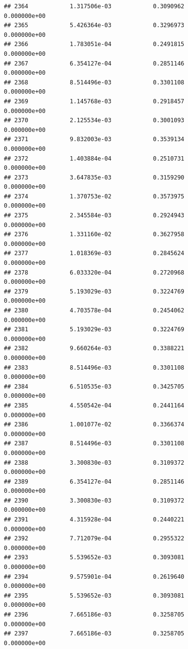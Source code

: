 \documentclass[
]{article}
\begin{document}
\begin{verbatim}
## 2364            1.317506e-03            0.3090962            0.000000e+00
## 2365            5.426364e-03            0.3296973            0.000000e+00
## 2366            1.783051e-04            0.2491815            0.000000e+00
## 2367            6.354127e-04            0.2851146            0.000000e+00
## 2368            8.514496e-03            0.3301108            0.000000e+00
## 2369            1.145768e-03            0.2918457            0.000000e+00
## 2370            2.125534e-03            0.3001093            0.000000e+00
## 2371            9.832003e-03            0.3539134            0.000000e+00
## 2372            1.403884e-04            0.2510731            0.000000e+00
## 2373            3.647835e-03            0.3159290            0.000000e+00
## 2374            1.370753e-02            0.3573975            0.000000e+00
## 2375            2.345584e-03            0.2924943            0.000000e+00
## 2376            1.331160e-02            0.3627958            0.000000e+00
## 2377            1.018369e-03            0.2845624            0.000000e+00
## 2378            6.033320e-04            0.2720968            0.000000e+00
## 2379            5.193029e-03            0.3224769            0.000000e+00
## 2380            4.703578e-04            0.2454062            0.000000e+00
## 2381            5.193029e-03            0.3224769            0.000000e+00
## 2382            9.660264e-03            0.3388221            0.000000e+00
## 2383            8.514496e-03            0.3301108            0.000000e+00
## 2384            6.510535e-03            0.3425705            0.000000e+00
## 2385            4.550542e-04            0.2441164            0.000000e+00
## 2386            1.001077e-02            0.3366374            0.000000e+00
## 2387            8.514496e-03            0.3301108            0.000000e+00
## 2388            3.300830e-03            0.3109372            0.000000e+00
## 2389            6.354127e-04            0.2851146            0.000000e+00
## 2390            3.300830e-03            0.3109372            0.000000e+00
## 2391            4.315928e-04            0.2440221            0.000000e+00
## 2392            7.712079e-04            0.2955322            0.000000e+00
## 2393            5.539652e-03            0.3093081            0.000000e+00
## 2394            9.575901e-04            0.2619640            0.000000e+00
## 2395            5.539652e-03            0.3093081            0.000000e+00
## 2396            7.665186e-03            0.3258705            0.000000e+00
## 2397            7.665186e-03            0.3258705            0.000000e+00

\end{verbatim}
\end{document}
